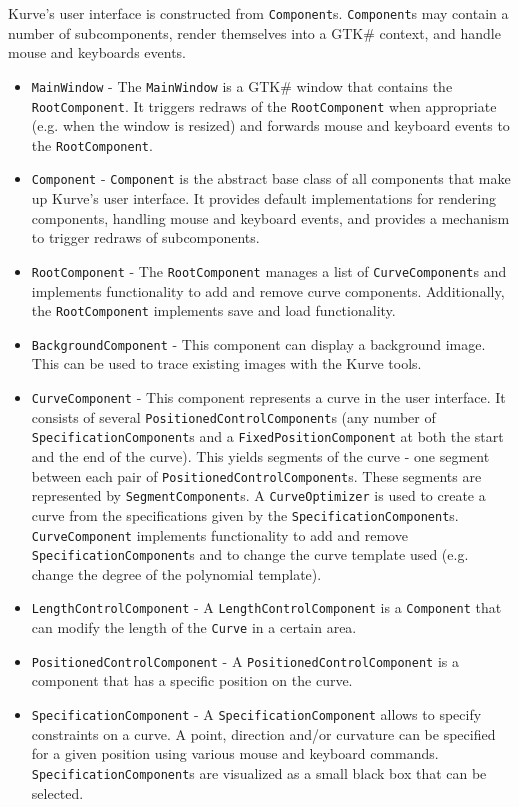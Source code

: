 \documentclass[a4paper]{article}
\begin{document}
				Kurve's user interface is constructed from \verb|Component|s. \verb|Component|s may contain a number of subcomponents, render themselves into a GTK\# context, and handle mouse and keyboards events. 
				\begin{itemize} 
					\item \verb|MainWindow| - The \verb|MainWindow| is a GTK\# window that contains the \verb|RootComponent|. It triggers redraws of the \verb|RootComponent| when appropriate (e.g. when the window is resized) and forwards mouse and keyboard events to the \verb|RootComponent|.
					\item \verb|Component| - \verb|Component| is the abstract base class of all components that make up Kurve's user interface. It provides default implementations for rendering components, handling mouse and keyboard events, and provides a mechanism to trigger redraws of subcomponents.
					\item \verb|RootComponent| - The \verb|RootComponent| manages a list of \verb|CurveComponent|s and implements functionality to add and remove curve components. Additionally, the \verb|RootComponent| implements save and load functionality.
					\item \verb|BackgroundComponent| - This component can display a background image. This can be used to trace existing images with the Kurve tools.
					\item \verb|CurveComponent| - This component represents a curve in the user interface. It consists of several \verb|PositionedControlComponent|s (any number of \verb|SpecificationComponent|s and a \verb|FixedPositionComponent| at both the start and the end of the curve). This yields segments of the curve - one segment between each pair of \verb|PositionedControlComponent|s. These segments are represented by \verb|SegmentComponent|s. A \verb|CurveOptimizer| is used to create a curve from the specifications given by the \verb|SpecificationComponent|s. \verb|CurveComponent| implements functionality to add and remove \verb|SpecificationComponent|s and to change the curve template used (e.g. change the degree of the polynomial template). 
					\item \verb|LengthControlComponent| - A \verb|LengthControlComponent| is a \verb|Component| that can modify the length of the \verb|Curve| in a certain area.
					\item \verb|PositionedControlComponent| - A \verb|PositionedControlComponent| is a component that has a specific position on the curve. 
					\item \verb|SpecificationComponent| - A \verb|SpecificationComponent| allows to specify constraints on a curve. A point, direction and/or curvature can be specified for a given position using various mouse and keyboard commands. \verb|SpecificationComponent|s are visualized as a small black box that can be selected.

\end{itemize}
\end{document}
